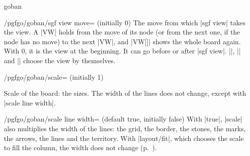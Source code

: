 \begin{environment}{{goban}}
	\begin{key}{/pgfgo/goban/sgf view move= (initially 0)}
		The move from which |sgf view| takes the view. A |VW| holds from the move of its node (or from the next one, if the node has no move) to the next |VW|, and |VW[]| shows the whole board again. With 0, it is the view at the beginning. It can go before or after |sgf view|. |\sgfdiagrams|, |\sgfanimation| and |\sgfproblem| choose the view by themselves.

		\begin{codeexample}
			\begin{goban}[sgf view = game, sgf view move = 120]
			\end{goban}
		\end{codeexample}
	\end{key}

	\begin{key}{/pgfgo/goban/scale= (initially 1)}

		Scale of the board: the sizes. The width of the lines does not change, except with |scale line width|.

		\begin{codeexample}[width=5.5cm]
			\begin{goban}[2, scale = 2]
			\end{goban}

			\begin{goban}[2, scale = 1]
			\end{goban}

			\begin{goban}[2, scale = 0.5]
			\end{goban}
		\end{codeexample}
	\end{key}

	\begin{key}{/pgfgo/goban/scale line width= (default true, initially false)}
		With |true|, |scale| also multiplies the width of the lines: the grid, the border, the stones, the marks, the arrows, the lines and the territory. With |layout/fit|, which chooses the scale to fill the column, the width does not change (p.~\pageref{subsec:disposicion}).

		\begin{codeexample}[width=5.5cm]
			\begin{goban}[2, scale = 2]
			\end{goban}


\end{codeexample}
\end{key}
\end{environment}
